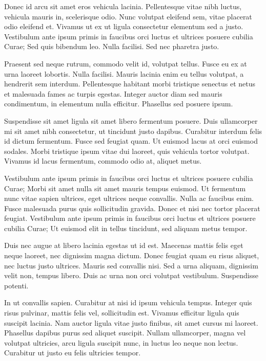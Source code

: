 \documentclass[12pt,a4paper,oneside]{report}
\begin{document}
Donec id arcu sit amet eros vehicula lacinia. Pellentesque vitae nibh luctus, vehicula mauris in, scelerisque odio. Nunc volutpat eleifend sem, vitae placerat odio eleifend et. Vivamus ut ex ut ligula consectetur elementum sed a justo. Vestibulum ante ipsum primis in faucibus orci luctus et ultrices posuere cubilia Curae; Sed quis bibendum leo. Nulla facilisi. Sed nec pharetra justo.

Praesent sed neque rutrum, commodo velit id, volutpat tellus. Fusce eu ex at urna laoreet lobortis. Nulla facilisi. Mauris lacinia enim eu tellus volutpat, a hendrerit sem interdum. Pellentesque habitant morbi tristique senectus et netus et malesuada fames ac turpis egestas. Integer auctor diam sed mauris condimentum, in elementum nulla efficitur. Phasellus sed posuere ipsum.

Suspendisse sit amet ligula sit amet libero fermentum posuere. Duis ullamcorper mi sit amet nibh consectetur, ut tincidunt justo dapibus. Curabitur interdum felis id dictum fermentum. Fusce sed feugiat quam. Ut euismod lacus at orci euismod sodales. Morbi tristique ipsum vitae dui laoreet, quis vehicula tortor volutpat. Vivamus id lacus fermentum, commodo odio at, aliquet metus.

Vestibulum ante ipsum primis in faucibus orci luctus et ultrices posuere cubilia Curae; Morbi sit amet nulla sit amet mauris tempus euismod. Ut fermentum nunc vitae sapien ultrices, eget ultrices neque convallis. Nulla ac faucibus enim. Fusce malesuada purus quis sollicitudin gravida. Donec et nisi nec tortor placerat feugiat. Vestibulum ante ipsum primis in faucibus orci luctus et ultrices posuere cubilia Curae; Ut euismod elit in tellus tincidunt, sed aliquam metus tempor.

Duis nec augue at libero lacinia egestas ut id est. Maecenas mattis felis eget neque laoreet, nec dignissim magna dictum. Donec feugiat quam eu risus aliquet, nec luctus justo ultrices. Mauris sed convallis nisi. Sed a urna aliquam, dignissim velit non, tempus libero. Duis ac urna non orci volutpat vestibulum. Suspendisse potenti.

In ut convallis sapien. Curabitur at nisi id ipsum vehicula tempus. Integer quis risus pulvinar, mattis felis vel, sollicitudin est. Vivamus efficitur ligula quis suscipit lacinia. Nam auctor ligula vitae justo finibus, sit amet cursus mi laoreet. Phasellus dapibus purus sed aliquet suscipit. Nullam ullamcorper, magna vel volutpat ultricies, arcu ligula suscipit nunc, in luctus leo neque non lectus. Curabitur ut justo eu felis ultricies tempor.
\end{document}
